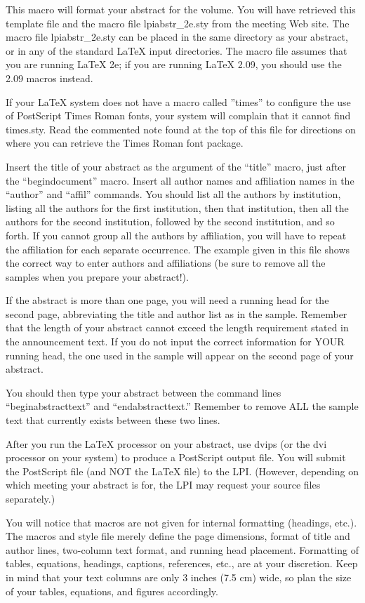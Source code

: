 \documentclass{article}  %
\begin{document}
\begin{abstracttext}
This macro will format your abstract for the volume.
You will have retrieved this template file and the macro file lpiabstr\_2e.sty
from the meeting Web site.  The macro file lpiabstr\_2e.sty can be placed
in the same directory as your abstract, or in any of the standard LaTeX
input directories.  The macro file assumes that you are running LaTeX 2e;
if you are running LaTeX 2.09, you should use the 2.09 macros instead.

If your LaTeX system does not have a macro called ''times'' to configure
the use of PostScript Times Roman fonts, your system will complain that
it cannot find times.sty. Read the commented note found at the top of this
file for directions on where you can retrieve the Times Roman font package.

Insert the title of your abstract as the argument of the ``title'' macro,
just after the ``begin{document}'' macro.  Insert all author names and
affiliation names in the ``author'' and ``affil'' commands.  You should
list all the authors by institution, listing all the authors for the first
institution, then that institution, then all the authors for the second
institution, followed by the second institution, and so forth. If you
cannot group all the authors by affiliation, you will have to repeat
the affiliation for each separate occurrence. The example given in this
file shows the correct way to enter authors and affiliations (be sure to
remove all the samples when you prepare your abstract!). 

If the abstract is more than one page, you will need a running head for the
second page, abbreviating the title and author list as in the sample. 
Remember that the length of your abstract cannot exceed the length requirement
stated in the announcement text. If you
do not input the correct information for YOUR running head, the one used
in the sample will appear on the second page of your abstract.

You should then type your abstract between the command lines
``begin{abstracttext}'' and ``end{abstracttext}.'' Remember to remove
ALL the sample text that currently exists between these two lines.

After you run the LaTeX processor on your abstract, use dvips (or the dvi
processor on your system) to produce a PostScript output file.  You will
submit the PostScript file (and NOT the LaTeX file) to the LPI. (However,
depending on which meeting your abstract is for, the LPI may request your
source files separately.)

You will notice that macros are not given for internal formatting (headings,
etc.). The macros and style file merely define the page dimensions, format
of title and author lines, two-column text format, and running head
placement. Formatting of tables, equations, headings, captions, 
references, etc., are at your discretion. Keep in mind that your text
columns are only 3 inches (7.5 cm) wide, so plan the size of your tables, 
equations, and figures accordingly.

\end{abstracttext}
\end{document}
